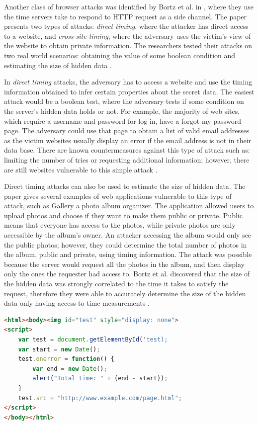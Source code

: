 \documentclass[10pt,a4paper,twoside]{book}
\begin{document}
Another class of browser attacks was identified by Bortz et al. in \cite{bortz2007exposing}, where they use the time servers take to respond to HTTP request as a side channel. The paper presents two types of attacks: \textit{direct timing}, where the attacker has direct access to a website, and \textit{cross-site timing}, where the adversary uses the victim's view of the website to obtain private information. The researchers tested their attacks on two real world scenarios: obtaining the value of some boolean condition and estimating the size of hidden data \cite{bortz2007exposing}.

In \textit{direct timing} attacks, the adversary has to access a website and use the timing information obtained to infer certain properties about the secret data. The easiest attack would be a boolean test, where the adversary tests if some condition on the server's hidden data holds or not. For example, the majority of web sites, which require a username and password for log in, have a forgot my password page. The adversary could use that page to obtain a list of valid email addresses as the victim websites usually display an error if the email address is not in their data base. There are known countermeasures against this type of attack such as: limiting the number of tries or requesting additional information; however, there are still websites vulnerable to this simple attack \cite{bortz2007exposing}. 

Direct timing attacks can also be used to estimate the size of hidden data. The paper gives several examples of web applications vulnerable to this type of attack, such as Gallery a photo album organizer. The application allowed users to upload photos and choose if they want to make them public or private. Public means that everyone has access to the photos, while private photos are only accessible by the album's owner. An attacker accessing the album would only see the public photos; however, they could determine the total number of photos in the album, public and private, using timing information. The attack was possible because the server would request all the photos in the album, and then display only the ones the requester had access to. Bortz et al. discovered that the size of the hidden data was strongly correlated to the time it takes to satisfy the request, therefore they were able to accurately determine the size of the hidden data only having access to time measurements \cite{bortz2007exposing}. 

\begin{lstlisting}[caption={Example JavaScript timing code as shown in \cite{bortz2007exposing}},label={bortz}, language=HTML, showstringspaces=false]
<html><body><img id="test" style="display: none">
<script>
	var test = document.getElementById('test);
	var start = new Date();
	test.onerror = function() {
		var end = new Date();
		alert("Total time: " + (end - start));
	}
	test.src = "http://www.example.com/page.html";
</script>
</body></html>
\end{lstlisting}
\end{document}
